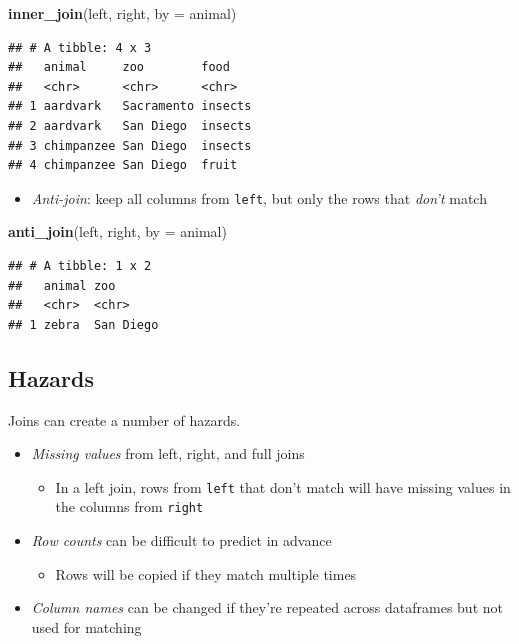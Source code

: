 \documentclass[
]{article}
\newenvironment{Shaded}{\begin{snugshade}}{\end{snugshade}}
\newcommand{\DataTypeTok}[1]{\textcolor[rgb]{0.13,0.29,0.53}{#1}}
\newcommand{\KeywordTok}[1]{\textcolor[rgb]{0.13,0.29,0.53}{\textbf{#1}}}
\newcommand{\NormalTok}[1]{#1}
\newcommand{\StringTok}[1]{\textcolor[rgb]{0.31,0.60,0.02}{#1}}
\providecommand{\tightlist}{%
  \setlength{\itemsep}{0pt}\setlength{\parskip}{0pt}}
\begin{document}
\begin{Shaded}
\begin{Highlighting}[]
\KeywordTok{inner\_join}\NormalTok{(left, right, }\DataTypeTok{by =} \StringTok{\textquotesingle{}animal\textquotesingle{}}\NormalTok{)}
\end{Highlighting}
\end{Shaded}

\begin{verbatim}
## # A tibble: 4 x 3
##   animal     zoo        food   
##   <chr>      <chr>      <chr>  
## 1 aardvark   Sacramento insects
## 2 aardvark   San Diego  insects
## 3 chimpanzee San Diego  insects
## 4 chimpanzee San Diego  fruit
\end{verbatim}

\begin{itemize}
\tightlist
\item
  \emph{Anti-join}: keep all columns from \texttt{left}, but only the rows that \emph{don't} match
\end{itemize}

\begin{Shaded}
\begin{Highlighting}[]
\KeywordTok{anti\_join}\NormalTok{(left, right, }\DataTypeTok{by =} \StringTok{\textquotesingle{}animal\textquotesingle{}}\NormalTok{)}
\end{Highlighting}
\end{Shaded}

\begin{verbatim}
## # A tibble: 1 x 2
##   animal zoo      
##   <chr>  <chr>    
## 1 zebra  San Diego
\end{verbatim}

\hypertarget{hazards}{%
\subsection{Hazards}\label{hazards}}

Joins can create a number of hazards.

\begin{itemize}
\tightlist
\item
  \emph{Missing values} from left, right, and full joins

  \begin{itemize}
  \tightlist
  \item
    In a left join, rows from \texttt{left} that don't match will have missing values in the columns from \texttt{right}
  \end{itemize}
\item
  \emph{Row counts} can be difficult to predict in advance

  \begin{itemize}
  \tightlist
  \item
    Rows will be copied if they match multiple times
  \end{itemize}
\item
  \emph{Column names} can be changed if they're repeated across dataframes but not used for matching
\end{itemize}
\end{document}
